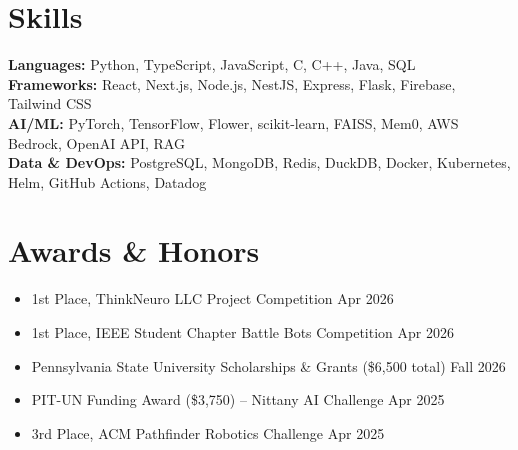 \documentclass[11pt,a4paper]{article}
\newenvironment{details}{\begin{itemize}[leftmargin=1.4em, label=\textbullet, topsep=0pt, itemsep=0pt, parsep=0pt, partopsep=0pt]}{\end{itemize}}
\begin{document}
\section{Skills}
\textbf{Languages:} Python, TypeScript, JavaScript, C, C++, Java, SQL \\
\textbf{Frameworks:} React, Next.js, Node.js, NestJS, Express, Flask, Firebase, Tailwind CSS \\
\textbf{AI/ML:} PyTorch, TensorFlow, Flower, scikit-learn, FAISS, Mem0, AWS Bedrock, OpenAI API, RAG \\
\textbf{Data \& DevOps:} PostgreSQL, MongoDB, Redis, DuckDB, Docker, Kubernetes, Helm, GitHub Actions, Datadog

\section{Awards \& Honors}
\begin{details}
\item 1st Place, ThinkNeuro LLC Project Competition \hfill Apr 2026
\item 1st Place, IEEE Student Chapter Battle Bots Competition \hfill Apr 2026
\item Pennsylvania State University Scholarships \& Grants (\$6,500 total) \hfill Fall 2026
\item PIT-UN Funding Award (\$3,750) – Nittany AI Challenge \hfill Apr 2025
\item 3rd Place, ACM Pathfinder Robotics Challenge \hfill Apr 2025
\end{details}
\end{document}
